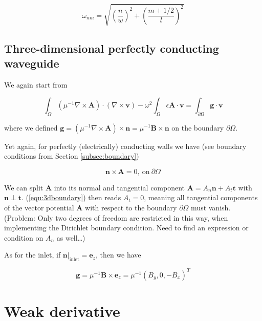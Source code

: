 \documentclass[11pt, a4paper]{article}
\begin{document}
\begin{equation}
    \omega_{nm} = \sqrt{\left(\frac{n}{w}\right)^2 + \left(\frac{m+1/2}{l}\right)^2}
\end{equation}

\subsection{Three-dimensional perfectly conducting waveguide}
\label{subsec:3dwaveguide}

We again start from 

\begin{equation}
    \int_{\Omega} (\mu^{-1} \nabla \times \mathbf{A}) \cdot (\nabla \times \mathbf{v})
    - \omega^2 \int_{\Omega}  \epsilon \mathbf{A} \cdot \mathbf{v} 
    = \int_{\partial \Omega} \mathbf{g} \cdot \mathbf{v}
\end{equation}

where we defined $\mathbf{g} = ({\mu^{-1} \nabla \times \mathbf{A}}) \times \mathbf{n} =
\mu^{-1} \mathbf{B} \times \mathbf{n}$ on the boundary $\partial \Omega$.

Yet again, for perfectly (electrically) conducting walls we have (see boundary
conditions from Section \ref{subsec:boundary})

\begin{equation}
    \mathbf{n} \times \mathbf{A} = 0, ~\text{on}~ \partial \Omega \label{equ:3dboundary}
\end{equation}

We can split $\mathbf{A}$ into its normal and tangential component
$\mathbf{A} = A_n \mathbf{n} + A_t \mathbf{t}$ with $\mathbf{n} \perp \mathbf{t}$.
(\ref{equ:3dboundary}) then reads $A_t = 0$, meaning all tangential components of
the vector potential $\mathbf{A}$ with respect to the boundary $\partial \Omega$
must vanish. (Problem: Only two degrees of freedom are restricted in this way,
when implementing the Dirichlet boundary condition. Need to find an expression
or condition on $A_n$ as well\dots)

As for the inlet, if $\mathbf{n}|_{\text{inlet}} = \mathbf{e}_z$, then we have 

\begin{equation}
    \mathbf{g} = \mu^{-1} \mathbf{B} \times \mathbf{e}_z = \mu^{-1}(B_y, 0, -B_x)^T
\end{equation}

\section{Weak derivative}
\label{sec:weak}
\end{document}
